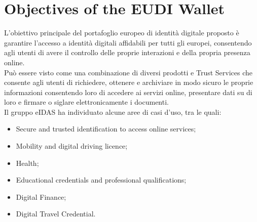 \section{Objectives of the EUDI Wallet}
L'obiettivo principale del portafoglio europeo di identità digitale proposto è garantire l'accesso a identità digitali affidabili per tutti gli europei, consentendo agli utenti di avere il controllo delle proprie interazioni e della propria presenza online.\\
Può essere visto come una combinazione di diversi prodotti e Trust Services che consente agli utenti di richiedere, ottenere e archiviare in modo sicuro le proprie informazioni consentendo loro di accedere ai servizi online, presentare dati su di loro e firmare o siglare elettronicamente i documenti.\\
Il gruppo eIDAS ha individuato alcune aree di casi d'uso, tra le quali:
\begin{itemize}
    \item Secure and trusted identification to access online services;
    \item Mobility and digital driving licence;
    \item Health;
    \item Educational credentials and professional qualifications;
    \item Digital Finance;
    \item Digital Travel Credential.
\end{itemize}
